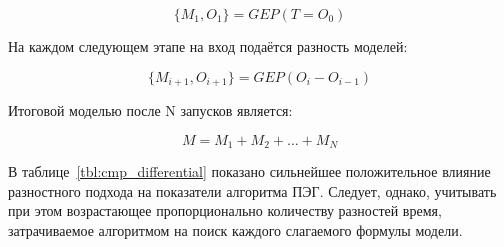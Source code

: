 \begin{equation}
\label{eq:zerg_diff_m_1}
\{M_{1}, O_{1}\} = GEP(T = O_{0})
\end{equation}

На каждом следующем этапе на вход подаётся разность моделей:

\begin{equation}
\label{eq:zerg_diff_m_i}
\{M_{i+1}, O_{i+1}\} = GEP(O_{i} - O_{i - 1})
\end{equation}

Итоговой моделью после N запусков является:

\begin{equation}
\label{eq:zerg_diff_model}
M = M_{1} + M_{2} + \ldots + M_{N}
\end{equation}

В таблице~\ref{tbl:cmp_differential} показано сильнейшее положительное влияние разностного подхода на показатели алгоритма ПЭГ. Следует, однако, учитывать при этом возрастающее пропорционально количеству разностей время, затрачиваемое алгоритмом на поиск каждого слагаемого формулы модели.

%
